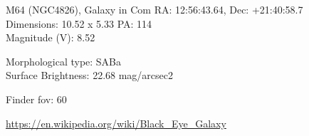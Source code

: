 \begin{block}{M64 (NGC4826), Galaxy in Com}
    RA: 12:56:43.64, Dec: +21:40:58.7 \\ 
    Dimensions: 10.52 x 5.33 PA: 114 \\ 
    Magnitude (V): 8.52

    Morphological type: SABa \\ 
    Surface Brightness: 22.68 mag/arcsec2 


    Finder fov: 60 

    \url{https://en.wikipedia.org/wiki/Black_Eye_Galaxy} 
\end{block}